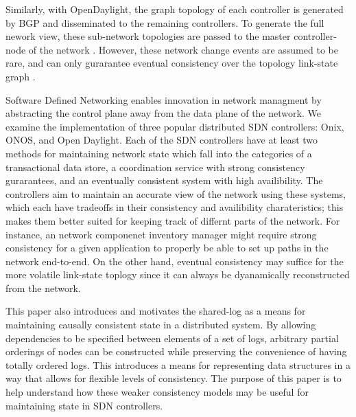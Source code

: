 \documentclass[letterpaper,twocolumn,10pt]{article}
\begin{document}
Similarly, with OpenDaylight, the graph topology of each controller is generated by BGP and disseminated to the remaining controllers. To generate the full nework view, these sub-network topologies are passed to the master controller-node of the network \cite{ONV:wiki}. However, these network change events are assumed to be rare, and can only gurarantee eventual consistency over the topology link-state graph \cite{bgp:rfc}.


Software Defined Networking enables innovation in network managment by abstracting the control plane away from the data plane of the network. We examine the implementation of three popular distributed SDN controllers: Onix, ONOS, and Open Daylight. Each of the SDN controllers have at least two methods for maintaining network state which fall into the categories of a transactional data store, a coordination service with strong consistency gurarantees, and an eventually consistent system with high availibility. The controllers aim to maintain an accurate view of the network using these systems, which each have tradeoffs in their consistency and availibility charateristics; this makes them better suited for keeping track of differnt parts of the network. For instance, an network componenet inventory manager might require strong consistency for a given application to properly be able to set up paths in the network end-to-end. On the other hand, eventual consistency may suffice for the more volatile link-state toplogy since it can always be dyanamically reconstructed from the network.

This paper also introduces and motivates the shared-log as a means for maintaining causally consistent state in a distributed system. By allowing dependencies to be specified between elements of a set of logs, arbitrary partial orderings of nodes can be constructed while preserving the convenience of having totally ordered logs. This introduces a means for representing data structures in a way that allows for flexible levels of consistency. The purpose of this paper is to help understand how these weaker consistency models may be useful for maintaining state in SDN controllers. 




\end{document}
